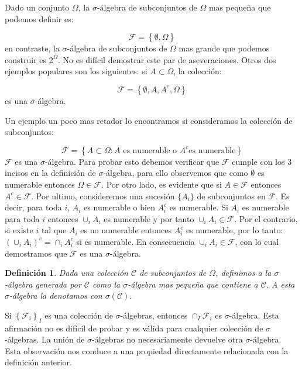 \documentclass{extreport}
\theoremstyle{definicion}
\newtheorem{definition}{Definición}[chapter]
\theoremstyle{propiedad}
\theoremstyle{teorema}
\begin{document}
Dado un conjunto $\Omega$, la $\sigma$-álgebra de subconjuntos de $\Omega$ mas pequeña que podemos definir es:

$$
\mathcal{F} = \left\{\emptyset, \Omega\right\}
$$
en contraste, la $\sigma$-álgebra de subconjuntos de $\Omega$  mas grande que podemos construir es $2^\Omega$. No es difícil demostrar este par de aseveraciones. Otros dos ejemplos populares son los siguientes: si $A\subset \Omega$, la colección:

$$
\mathcal{F} = \left\{\emptyset, A, A^c,\Omega\right\}
$$
es una $\sigma$-álgebra.

Un ejemplo un poco mas retador lo encontramos si consideramos la colección de subconjuntos:

$$
\mathcal{F} = \left\{A\subset \Omega: A \text{ es numerable o } A^c \text{es numerable}\right\}
$$
$\mathcal{F}$ es una $\sigma$-álgebra. Para probar esto debemos verificar que $\mathcal{F}$ cumple con los 3 incisos en la definición de $\sigma$-álgebra, para ello observemos que como $\emptyset$ es numerable entonces $\Omega\in \mathcal{F}$. Por otro lado, es evidente que si $A\in \mathcal{F}$ entonces $A^c\in \mathcal{F}$. Por ultimo, consideremos una sucesión $\{A_i\}$ de subconjuntos en $\mathcal{F}$. Es decir, para toda $i$,  $A_i$ es numerable o bien $A_i^c$ es numerable. Si $A_i$ es numerable para toda $i$ entonces $\cup_iA_i$ es numerable y por tanto $\cup_i A_i\in \mathcal{F}$. Por el contrario, si existe $i$ tal que $A_i$ es no numerable entonces $A_i^c$ es numerable, por lo tanto: $\left(\cup_iA_i\right)^c = \cap_iA_i^c$ si es numerable. En consecuencia $\cup_iA_i\in \mathcal{F}$, con lo cual demostramos que $\mathcal{F}$ es una $\sigma$-álgebra.



\begin{definition}
Dada una colección $\mathcal{C}$ de subconjuntos de $\Omega$, definimos a la $\sigma$-álgebra generada por $\mathcal{C}$ como la $\sigma$-álgebra mas pequeña que contiene a $\mathcal{C}$. A esta $\sigma$-álgebra la denotamos con $\sigma(\mathcal{C})$.    
\end{definition}

Si $\left\{\mathcal{F}_i\right\}_I$ es una colección de $\sigma$-álgebras, entonces $\cap_I \mathcal{F}_i$ es $\sigma$-álgebra.  Esta afirmación no es difícil de probar y es válida para cualquier colección de $\sigma$-álgebras. La unión de $\sigma$-álgebras no necesariamente devuelve otra $\sigma$-álgebra. Esta observación nos conduce a una propiedad directamente relacionada con la definición anterior.
\end{document}
